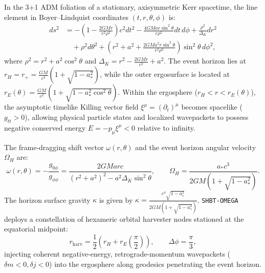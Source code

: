 \documentclass[11pt,onecolumn]{article}
\begin{document}
In the 3+1 ADM foliation of a stationary, axisymmetric Kerr spacetime, the line element in Boyer--Lindquist coordinates $(t, r, \theta, \phi)$ is:
\begin{align}
ds^2 &= -\left(1 - \frac{2 G M r}{c^2 \rho^2}\right) c^2 dt^2 - \frac{4 G M a r \sin^2\theta}{c \rho^2} dt \, d\phi + \frac{\rho^2}{\Delta_K} dr^2 \nonumber \\
&\quad + \rho^2 d\theta^2 + \left(r^2 + a^2 + \frac{2 G M a^2 r \sin^2\theta}{c^2 \rho^2}\right) \sin^2\theta \, d\phi^2,
\label{eq:kerr_metric}
\end{align}
where $\rho^2 = r^2 + a^2 \cos^2\theta$ and $\Delta_K = r^2 - \frac{2 G M r}{c^2} + a^2$. The event horizon lies at $r_H = r_+ = \frac{GM}{c^2}(1 + \sqrt{1 - a_*^2})$, while the outer ergosurface is located at $r_E(\theta) = \frac{GM}{c^2}(1 + \sqrt{1 - a_*^2 \cos^2\theta})$. Within the ergosphere ($r_H < r < r_E(\theta)$), the asymptotic timelike Killing vector field $\xi^\mu = (\partial_t)^\mu$ becomes spacelike ($g_{tt} > 0$), allowing physical particle states and localized wavepackets to possess negative conserved energy $E = -p_\mu \xi^\mu < 0$ relative to infinity.

The frame-dragging shift vector $\omega(r,\theta)$ and the event horizon angular velocity $\Omega_H$ are:
\begin{equation}
\omega(r, \theta) = -\frac{g_{0\phi}}{g_{\phi\phi}} = \frac{2 G M a r c}{(r^2 + a^2)^2 - a^2\Delta_K\sin^2\theta}, \qquad \Omega_H = \frac{a_* c^3}{2 G M \left(1 + \sqrt{1 - a_*^2}\right)}.
\label{eq:smbh_horizon_params}
\end{equation}
The horizon surface gravity $\kappa$ is given by $\kappa = \frac{c^4 \sqrt{1 - a_*^2}}{2 G M (1 + \sqrt{1 - a_*^2})}$. \texttt{SHBT-OMEGA} deploys a constellation of hexameric orbital harvester nodes stationed at the equatorial midpoint:
\begin{equation}
r_{\text{harv}} = \frac{1}{2}\left( r_H + r_E\left(\frac{\pi}{2}\right) \right), \qquad \Delta\phi = \frac{\pi}{3},
\label{eq:hexameric_spacing}
\end{equation}
injecting coherent negative-energy, retrograde-momentum wavepackets ($\delta m < 0, \delta j < 0$) into the ergosphere along geodesics penetrating the event horizon.
\end{document}
